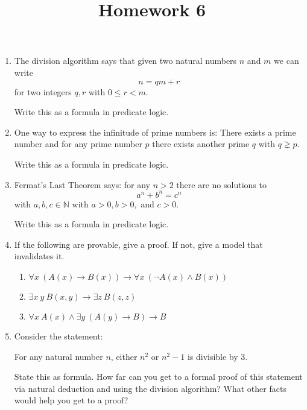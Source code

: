 \documentclass[12pt]{amsart}
\theoremstyle{definition}
\begin{document}
\title{Homework 6}

\maketitle

\begin{enumerate}
	\item The division algorithm says that given two natural numbers $n$ and $m$ we can write 
		\begin{displaymath}
			n = qm + r
		\end{displaymath}
		for two integers $q,r$ with $0 \leq r < m$. 

		Write this as a formula in predicate logic. 
	\item One way to express the infinitude of prime numbers is: There exists a prime number and 
		for any prime number $p$ there exists another prime $q$ with $q \gneq p$. 

		Write this as a formula in predicate logic. 
	\item Fermat's Last Theorem says: for any $n > 2$ there are no solutions to 
		\begin{displaymath}
			a^n + b^n = c^n 
		\end{displaymath}
		with $a,b,c \in \mathbb{N}$ with $a > 0, b > 0,$ and $c>0$. 
		
		Write this as a formula in predicate logic. 
	\item If the following are provable, give a proof. If not, give a model that invalidates it. 
	\begin{enumerate}
		\item $\displaystyle{\forall x~ (A(x) \to B(x)) \to \forall x~ (\neg A(x) \land B(x))}$
		\item $\displaystyle{\exists x~y~ B(x,y) \to \exists z~ B(z,z)}$
		\item $\displaystyle{\forall x~ A(x) \land \exists y~ (A(y) \to B) \to B}$
	\end{enumerate}
	\item Consider the statement:
	\begin{center}
		For any natural number $n$, either $n^2$ or $n^2 - 1$ is divisible by $3$. 
	\end{center}
	State this as formula. How far can you get to a formal proof of this statement via 
	natural deduction and using the division algorithm? What other facts would help you 
	get to a proof?
\end{enumerate}
\end{document}
